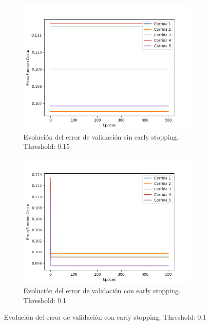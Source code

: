 \begin{figure}[!htbp]
\centering
\begin{subfigure}{.5\textwidth}
  \centering
  \includegraphics[width=1\linewidth]{graficos/ej2/early_stopping_validacion_0_15.png}
  \caption{Evolución del error de validación sin early stopping. Threshold: 0.15}
  \label{fig:sub1}
\end{subfigure}%
\begin{subfigure}{.5\textwidth}
  \centering
  \includegraphics[width=1\linewidth]{graficos/ej2/early_stopping_validacion_0_1.png}
  \caption{Evolución del error de validación con early stopping. Threshold: 0.1}
  \label{fig:sub2}
\end{subfigure}
\end{figure}

